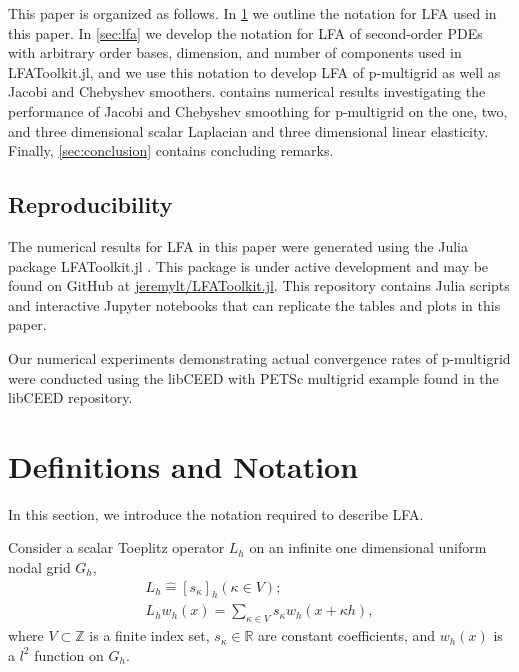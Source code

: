 \documentclass[review]{siamart190516}
\newcommand{\yh}[1]{\textcolor{magenta}{(\textbf{Yunhui: }#1)}}
\begin{document}
This paper is organized as follows.
In \cref{sec:notation} we outline the notation for LFA used in this paper.
In \cref{sec:lfa} we develop the notation for LFA of second-order PDEs with arbitrary order bases, dimension, and number of components used in LFAToolkit.jl, and we use this notation to develop LFA of p-multigrid as well as Jacobi and Chebyshev smoothers.
 contains numerical results investigating the performance of Jacobi and Chebyshev smoothing for p-multigrid on the one, two, and three dimensional scalar Laplacian and three dimensional linear elasticity.
Finally, \cref{sec:conclusion} contains concluding remarks.

\subsection{Reproducibility}\label{sec:reproducibility}


The numerical results for LFA in this paper were generated using the Julia package LFAToolkit.jl \cite{thompson2021toolkit}.
This package is under active development and may be found on GitHub at \href{https://github.com/jeremylt/LFAToolkit.jl}{jeremylt/LFAToolkit.jl}.
This repository contains Julia scripts and interactive Jupyter notebooks that can replicate the tables and plots in this paper.

Our numerical experiments demonstrating actual convergence rates of p-multigrid were conducted using the libCEED \cite{libceed-user-manual} with PETSc \cite{petsc-user-ref} multigrid example found in the libCEED repository.

\section{Definitions and Notation}\label{sec:notation}

In this section, we introduce the notation required to describe LFA.

Consider a scalar Toeplitz operator $L_h$ on an infinite one dimensional uniform nodal grid $G_h$,
\begin{equation}
\begin{split}
L_h \mathrel{\hat{=}} \left[ s_\kappa \right]_h \left( \kappa \in V \right);\\
L_h w_h \left( x \right) = \sum_{\kappa \in V} s_\kappa w_h \left( x + \kappa h \right),
\end{split}
\end{equation}
where $V \subset \mathbb{Z}$ is a finite index set, $s_\kappa \in \mathbb{R}$ are constant coefficients, and $w_h \left( x \right)$ is a $l^2$ function on $G_h$.
\end{document}
